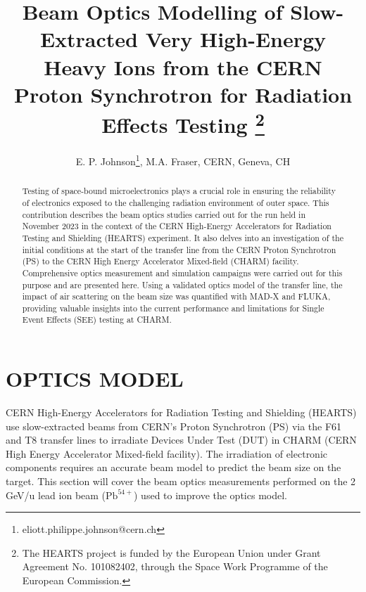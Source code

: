 \documentclass[a4paper,
               biblatex,     %
               ]{jacow}
\begin{document}
\title{Beam Optics Modelling of Slow-Extracted Very High-Energy Heavy Ions from the CERN Proton Synchrotron for Radiation Effects Testing \thanks{The HEARTS project is funded by the European Union under Grant Agreement No. 101082402, through the Space Work Programme of the European Commission.}}

\author{E. P. Johnson\thanks{eliott.philippe.johnson@cern.ch}, M.A. Fraser, CERN, Geneva, CH}
	
\maketitle

%
\begin{abstract}
   Testing of space-bound microelectronics plays a crucial role in ensuring the reliability of electronics exposed to the challenging radiation environment of outer space. This contribution describes the beam optics studies carried out for the run held in November 2023 in the context of the CERN High-Energy Accelerators for Radiation Testing and Shielding (HEARTS) experiment. It also delves into an investigation of the initial conditions at the start of the transfer line from the CERN Proton Synchrotron (PS) to the CERN High Energy Accelerator Mixed-field (CHARM) facility. Comprehensive optics measurement and simulation campaigns were carried out for this purpose and are presented here. Using a validated optics model of the transfer line, the impact of air scattering on the beam size was quantified with MAD-X and FLUKA, providing valuable insights into the current performance and limitations for Single Event Effects (SEE) testing at CHARM.
\end{abstract}







\section{OPTICS MODEL}

CERN High-Energy Accelerators for Radiation Testing and Shielding (HEARTS) \cite{noauthor_hearts_nodate} use slow-extracted beams from CERN's Proton Synchrotron (PS) via the F61 and T8 transfer lines to irradiate Devices Under Test (DUT) in CHARM (CERN High Energy Accelerator Mixed-field facility). The irradiation of electronic components requires an accurate beam model to predict the beam size on the target. This section will cover the beam optics measurements performed on the 2 GeV/u lead ion beam (\( \text{Pb}^{54+} \)) used to improve the optics model.
\end{document}
